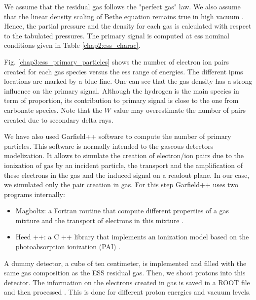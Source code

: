 \begin{refsection}
	

	We assume that the residual gas follows the "perfect gas" law. We also assume that the linear density scaling of Bethe equation remains true in high vacuum \cite[p. 108]{egber2012}\cite{Ishimaru1995}. Hence, the partial pressure and the density for each gas is calculated with respect to the tabulated pressures. The primary signal is computed at \acrshort{ess} nominal conditions given in Table \ref{chap2:ess_charac}.

	Fig. \ref{chap3:ess_primary_particles} shows the number of electron ion pairs created for each gas species versus the \acrshort{ess} range of energies. The different \acrshort{ipm}s locations are marked by a blue line. One can see that the gas density has a strong influence on the primary signal. Although the hydrogen is the main species in term of proportion, its contribution to primary signal is close to the one from carbonate species. Note that the \(W\) value may overestimate the number of pairs created due to secondary delta rays.

	

	We have also used Garfield++ software to compute the number of primary particles. This software is normally intended to the gaseous detectors modelization. It allows to simulate the creation of electron/ion pairs due to the ionization of gas by an incident particle, the transport and the amplification of these electrons in the gas and the induced signal on a readout plane. In our case, we simulated only the pair creation in gas. For this step Garfield++ uses two programs internally:
	\begin{itemize}
		\item Magboltz: a Fortran routine that compute different properties of a gas mixture and the transport of electrons in this mixture \cite{Biagi1989}.
		\item Heed ++: a C ++ library that implements an ionization model based on the photoabsorption ionization (PAI) \cite{Allison1980,Smirnov2005}.
	\end{itemize}

	
	A dummy detector, a cube of ten centimeter, is implemented and filled with the same gas composition as the ESS residual gas. Then, we shoot protons into this detector. The information on the electrons created in gas is saved in a ROOT file and then processed \cite{Brun1997,Antcheva2009}. This is done for different proton energies and vacuum levels.


\end{refsection}
